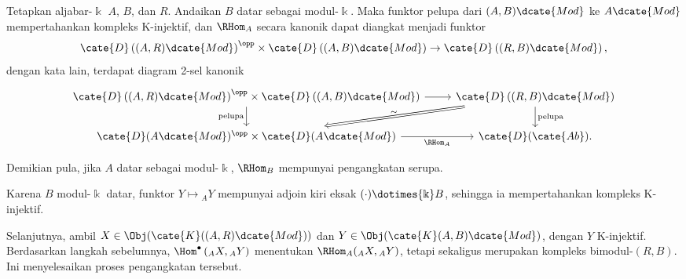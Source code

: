 \begin{lema}\label{prop:RHom-enrichment}
	Tetapkan aljabar-$\Bbbk$ $A$, $B$, dan $R$. Andaikan $B$ datar sebagai
	modul-$\Bbbk$. Maka funktor pelupa dari $(A,B)\dcate{Mod}$ ke
	$A\dcate{Mod}$ mempertahankan kompleks K-injektif, dan $\RHom_A$ secara
	kanonik dapat diangkat menjadi funktor
	\[ \cate{D}\left((A,R)\dcate{Mod}\right)^{\opp} \times \cate{D}\left((A,B)\dcate{Mod}\right) \to \cate{D}\left((R,B)\dcate{Mod}\right), \]
	dengan kata lain, terdapat diagram 2-sel kanonik
	\[\begin{tikzcd}
		\cate{D}\left((A,R)\dcate{Mod}\right)^{\opp} \times \cate{D}\left((A,B)\dcate{Mod}\right) \arrow[r] \arrow[d, "\text{pelupa}"'] & \cate{D}\left((R,B)\dcate{Mod}\right) \arrow[d, "\text{pelupa}"] \arrow[Rightarrow, ld, "\sim", sloped] \\
		\cate{D}(A\dcate{Mod})^{\opp} \times \cate{D}(A\dcate{Mod}) \arrow[r, "{\RHom_A}"'] & \cate{D}(\cate{Ab}) .
	\end{tikzcd}\]

	Demikian pula, jika $A$ datar sebagai modul-$\Bbbk$, $\RHom_B$ mempunyai
	pengangkatan serupa.
\end{lema}
\begin{bukti}
	Karena $B$ modul-$\Bbbk$ datar, funktor $Y\mapsto{}_A Y$ mempunyai adjoin
	kiri eksak $(\cdot)\dotimes{\Bbbk}B$, sehingga ia mempertahankan kompleks
	K-injektif.
	
	Selanjutnya, ambil
	$X \in \Obj(\cate{K}((A, R)\dcate{Mod}))$ dan
	$Y \in \Obj(\cate{K}(A, B)\dcate{Mod})$, dengan $Y$ K-injektif.
	Berdasarkan langkah sebelumnya,
	$\Hom^\bullet\left({}_A X,{}_A Y\right)$ menentukan
	$\RHom_A({}_A X,{}_A Y)$, tetapi sekaligus merupakan kompleks
	bimodul-$(R,B)$. Ini menyelesaikan proses pengangkatan tersebut.
\end{bukti}

